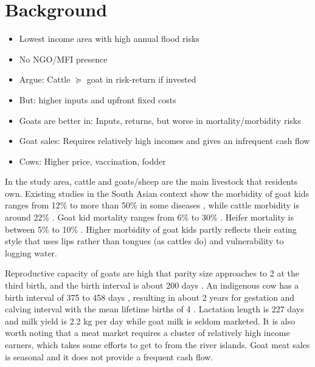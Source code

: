 \section{Background}
\label{SecBackground}

\begin{itemize}
\vspace{1.0ex}\setlength{\itemsep}{1.0ex}\setlength{\baselineskip}{12pt}
\item	Lowest income area with high annual flood risks
\item	No NGO/MFI presence
\item	Argue: Cattle $\succcurlyeq$ goat in risk-return if invested
\item	But: higher inputs and upfront fixed costs
\item	Goats are better in: Inputs, returns, but worse in mortality/morbidity risks
\item	Goat sales: Requires relatively high incomes and gives an infrequent cash flow
\item	Cows: Higher price, vaccination, fodder
\end{itemize}


	In the study area, cattle and goats/sheep are the main livestock that residents own. Existing studies in the South Asian context show the morbidity of goat kids ranges from 12\% \citep{Mahmud2015} to more than 50\% in some diseases \citep[][Table 5]{Nandi2011}, while cattle morbidity is around 22\% \citep{Bangar2013}. Goat kid mortality ranges from 6\% \citep{Mahmud2015} to 30\% \citep[][Table 5]{Paul2014} \citep{Ershaduzzaman2007}. Heifer mortality is between 5\% \citep[][p.332R]{Hossain2014} to 10\% \citep{Alauddin2018}. Higher morbidity of goat kids partly reflects their eating style that uses lips rather than tongues (as cattles do) and vulnerability to logging water. 

	Reproductive capacity of goats are high that parity size approaches to 2 at the third birth, and the birth interval is about 200 days \citep{Hasan2014goat}. An indigenous cow has a birth interval of 375 to 458 days \citep{Hasan2018}, resulting in about 2 years for gestation and calving interval \citep{Habib2012} with the mean lifetime births of 4 \citep[][Table 1]{Hasan2018}. Lactation length is 227 days and milk yield is 2.2 kg per day \citep{Rokonuzzaman2009} while goat milk is seldom marketed. It is also worth noting that a meat market requires a cluster of relatively high income earners, which takes some efforts to get to from the river islands. Goat meat sales is seasonal and it does not provide a frequent cash flow. 
	

